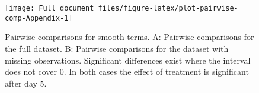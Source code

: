\documentclass[
]{article}
\begin{document}
\begin{figure}[H]

{\centering \texttt{[image: Full\_document\_files/figure-latex/plot-pairwise-comp-Appendix-1]} 

}

\caption{Pairwise comparisons for smooth terms. A: Pairwise comparisons for the full dataset. B: Pairwise comparisons for the dataset with missing observations. Significant differences exist where the interval does not cover 0. In both cases the effect of treatment is significant after day 5.}\label{fig:plot-pairwise-comp-Appendix}
\end{figure}
\end{document}
